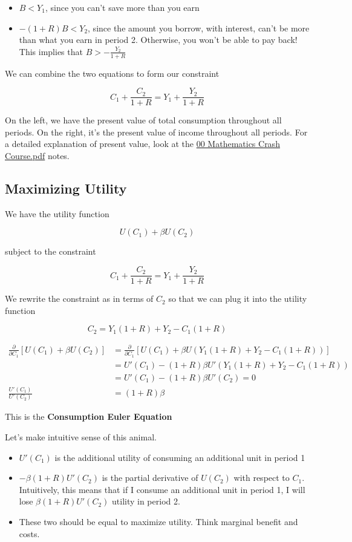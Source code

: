 \documentclass[11pt]{scrartcl}
\begin{document}
\begin{itemize}
\item $B < Y_1$, since you can't save more than you earn
\item $-(1+R)B < Y_2$, since the amount you borrow, with interest, can't be more than what you earn in period 2. Otherwise, you won't be able to pay back! This implies that $B > -\frac{Y_2}{1+R}$
\end{itemize}

We can combine the two equations to form our constraint 

\[ C_1 + \frac{C_2}{1+R} = Y_1 + \frac{Y_2}{1+R} \]

On the left, we have the present value of total consumption throughout all periods. On the right, it's the present value of income throughout all periods. For a detailed explanation of present value, look at the \href{https://github.com/linanqiu/econ-w3213-recitation-notes/blob/master/00\%20Mathematics\%20Crash\%20Course.pdf?raw=true
}{00 Mathematics Crash Course.pdf} notes.

\subsection{Maximizing Utility}

We have the utility function

\[ U(C_1) + \beta U(C_2)\]

subject to the constraint

\[ C_1 + \frac{C_2}{1+R} = Y_1 + \frac{Y_2}{1+R} \]

We rewrite the constraint as in terms of $C_2$ so that we can plug it into the utility function

\[ C_2 = Y_1 (1+R) + Y_2 - C_1 (1+R) \]

\begin{align*}
\frac{\partial}{\partial C_1} \left[ U(C_1) + \beta U(C_2) \right] &= \frac{\partial}{\partial C_1} \left[ U(C_1) +  \beta U(Y_1 (1+R) + Y_2 - C_1 (1+R)) \right] \\
&= U'(C_1) - (1+R)\beta U'(Y_1 (1+R) + Y_2 - C_1 (1+R)) \\
&=  U'(C_1) - (1+R)\beta U'(C_2) = 0 \\
\frac{U'(C_1)}{U'(C_2)} &= (1+R)\beta 
\end{align*}

This is the \textbf{Consumption Euler Equation}

Let's make intuitive sense of this animal.

\begin{itemize}
\item $U'(C_1)$ is the additional utility of consuming an additional unit in period 1
\item $-\beta (1+R) U'(C_2)$ is the partial derivative of $U(C_2)$ with respect to $C_1$. Intuitively, this means that if I consume an additional unit in period 1, I will lose $\beta (1+R) U'(C_2)$ utility in period 2.
\item These two should be equal to maximize utility. Think marginal benefit and costs.
\end{itemize}
\end{document}
